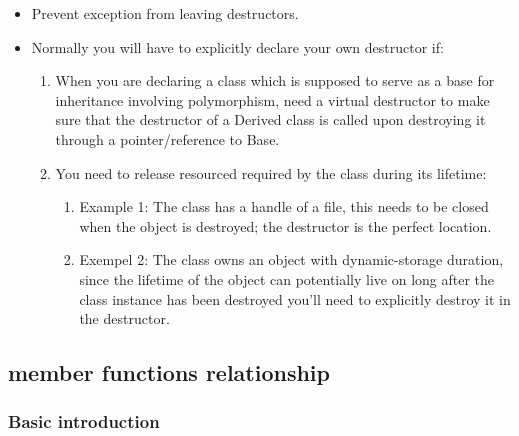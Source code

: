 \documentclass[a4paper,11pt,twoside]{book}
\begin{document}
\begin{itemize}
	\item Prevent exception from leaving destructors.
	
	\item Normally you will have to explicitly declare your own destructor if:

	\begin{enumerate}
		\item When you are declaring a class which is supposed to serve as a base for inheritance involving polymorphism, need a virtual destructor to make sure that the destructor of a Derived class is called upon destroying it through a pointer/reference to Base.
		
		\item You need to release resourced required by the class during its lifetime:
		\begin{enumerate}
			\item Example 1: The class has a handle of a file, this needs to be closed when the object is destroyed; the destructor is the perfect location.
			
			\item Exempel 2: The class owns an object with dynamic-storage duration, since the lifetime of the object can potentially live on long after the class instance has been destroyed you'll need to explicitly destroy it in the destructor.
		\end{enumerate}
	\end{enumerate}
\end{itemize}


\subsection{member functions relationship}

\subsubsection{Basic introduction}
\end{document}
